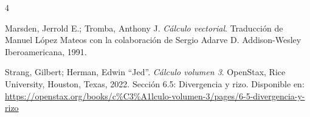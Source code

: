 \begin{thebibliography}{4}

Marsden, Jerrold E.; Tromba, Anthony J.
\textit{Cálculo vectorial}.
Traducción de Manuel López Mateos con la colaboración de Sergio Adarve D.
Addison-Wesley Iberoamericana, 1991.

Strang, Gilbert; Herman, Edwin “Jed”.
\textit{Cálculo volumen 3}.
OpenStax, Rice University, Houston, Texas, 2022.
Sección 6.5: Divergencia y rizo.
Disponible en:
\url{https://openstax.org/books/c%C3%A1lculo-volumen-3/pages/6-5-divergencia-y-rizo}

\end{thebibliography}